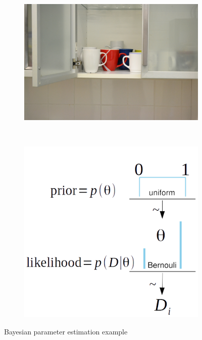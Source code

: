 \begin{figure}
    \centering
    \begin{subfigure}[b]{0.4\textwidth}
        \includegraphics[width=\textwidth]{images/cup_cupboard.jpg}
        \caption{}
        \label{fig:cup-cupboard-basics}
    \end{subfigure}
    ~ %
      \qquad
    \begin{subfigure}[b]{0.4\textwidth}
        \includegraphics[width=\textwidth]{images/Beta-Bernoulli.png}
        \caption{}
        \label{fig:prior-likelihood}
    \end{subfigure}
\caption[Bayesian learning example]{Bayesian parameter estimation example }
\label{fig: bayes-example}
\end{figure}
